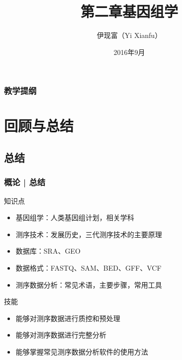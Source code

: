 



\title[基因组学]{第二章\quad 基因组学}
\author[Yixf]{伊现富（Yi Xianfu）}
\date{2016年9月}


\begin{frame}[label=current]
  \titlepage
\end{frame}

\begin{frame}[plain,label=current]
  \frametitle{教学提纲}
  \setcounter{tocdepth}{3}
  \begin{multicols}{2}
    \tableofcontents
  \end{multicols}
\end{frame}








\section{回顾与总结}
\subsection{总结}
\begin{frame}[label=current]
  \frametitle{概论 | 总结}
  \begin{block}{知识点}
    \begin{itemize}
      \item 基因组学：人类基因组计划，相关学科
      \item 测序技术：发展历史，三代测序技术的主要原理
      \item 数据库：SRA、GEO
      \item 数据格式：FASTQ、SAM、BED、GFF、VCF
      \item 测序数据分析：常见术语，主要步骤，常用工具
    \end{itemize}
  \end{block}
  \begin{block}{技能}
    \begin{itemize}
      \item 能够对测序数据进行质控和预处理
      \item 能够对测序数据进行完整分析
      \item 能够掌握常见测序数据分析软件的使用方法
    \end{itemize}
  \end{block}
\end{frame}

